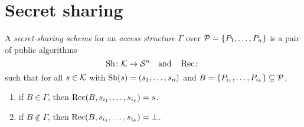 \chapter{Secret sharing} \label{chp:sharing}

\begin{definition} \label{def:sharing}
    A \emph{secret-sharing scheme} for an \emph{access structure}
    $\Gamma$ over $\mathcal{P} = \{P_1, \dots, P_n\}$ is a pair of
    public algorithms
    \[
        \operatorname{Sh}\colon \mathcal{K} \to \mathcal{S}^n
        \quad\text{and}\quad
        \operatorname{Rec}\colon 
    \] such that for all $s \in \mathcal{K}$ with $\operatorname{Sh}(s) = (s_1, \dots, s_n)$
    and $B = \{P_{i_1}, \dots, P_{i_k}\} \subseteq \mathcal{P}$,
    \begin{enumerate}
        \item if $B \in \Gamma$, then
            $\operatorname{Rec}(B, s_{i_1}, \dots, s_{i_k}) = s$.
        \item if $B \notin \Gamma$, then
            $\operatorname{Rec}(B, s_{i_1}, \dots, s_{i_k}) = \bot$.
    \end{enumerate}
\end{definition}
